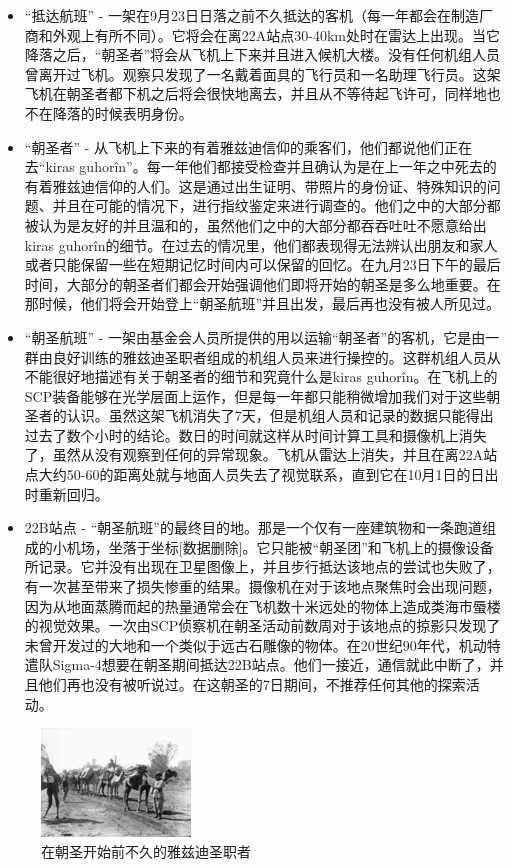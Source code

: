 \begin{itemize}
\item “抵达航班” - 一架在9月23日日落之前不久抵达的客机（每一年都会在制造厂商和外观上有所不同）。它将会在离22A站点30-40km处时在雷达上出现。当它降落之后，“朝圣者”将会从飞机上下来并且进入候机大楼。没有任何机组人员曾离开过飞机。观察只发现了一名戴着面具的飞行员和一名助理飞行员。这架飞机在朝圣者都下机之后将会很快地离去，并且从不等待起飞许可，同样地也不在降落的时候表明身份。
\item “朝圣者” - 从飞机上下来的有着雅兹迪信仰的乘客们，他们都说他们正在去“kiras guhorîn”。每一年他们都接受检查并且确认为是在上一年之中死去的有着雅兹迪信仰的人们。这是通过出生证明、带照片的身份证、特殊知识的问题、并且在可能的情况下，进行指纹鉴定来进行调查的。他们之中的大部分都被认为是友好的并且温和的，虽然他们之中的大部分都吞吞吐吐不愿意给出kiras guhorîn的细节。在过去的情况里，他们都表现得无法辨认出朋友和家人或者只能保留一些在短期记忆时间内可以保留的回忆。在九月23日下午的最后时间，大部分的朝圣者们都会开始强调他们即将开始的朝圣是多么地重要。在那时候，他们将会开始登上“朝圣航班”并且出发，最后再也没有被人所见过。
\item “朝圣航班” - 一架由基金会人员所提供的用以运输“朝圣者”的客机，它是由一群由良好训练的雅兹迪圣职者组成的机组人员来进行操控的。这群机组人员从不能很好地描述有关于朝圣者的细节和究竟什么是kiras guhorîn。在飞机上的SCP装备能够在光学层面上运作，但是每一年都只能稍微增加我们对于这些朝圣者的认识。虽然这架飞机消失了7天，但是机组人员和记录的数据只能得出过去了数个小时的结论。数日的时间就这样从时间计算工具和摄像机上消失了，虽然从没有观察到任何的异常现象。飞机从雷达上消失，并且在离22A站点大约50-60的距离处就与地面人员失去了视觉联系，直到它在10月1日的日出时重新回归。
\item 22B站点 - “朝圣航班”的最终目的地。那是一个仅有一座建筑物和一条跑道组成的小机场，坐落于坐标{[}数据删除]。它只能被“朝圣团”和飞机上的摄像设备所记录。它并没有出现在卫星图像上，并且步行抵达该地点的尝试也失败了，有一次甚至带来了损失惨重的结果。摄像机在对于该地点聚焦时会出现问题，因为从地面蒸腾而起的热量通常会在飞机数十米远处的物体上造成类海市蜃楼的视觉效果。一次由SCP侦察机在朝圣活动前数周对于该地点的掠影只发现了未曾开发过的大地和一个类似于远古石雕像的物体。在20世纪90年代，机动特遣队Sigma-4想要在朝圣期间抵达22B站点。他们一接近，通信就此中断了，并且他们再也没有被听说过。在这朝圣的7日期间，不推荐任何其他的探索活动。
\end{itemize}

\begin{figure}[H]
    \centering
    \includegraphics[width=0.3\linewidth]{images/SCP-036-2.jpg}
    \caption*{在朝圣开始前不久的雅兹迪圣职者}
\end{figure}

